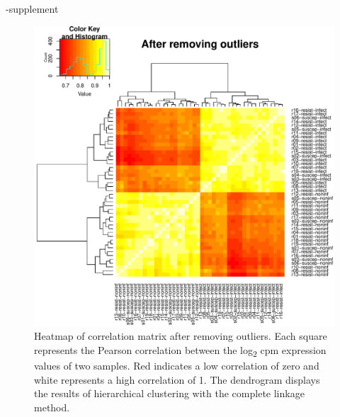 \documentclass[fleqn,10pt]{wlscirep}
\begin{document}
\begin{filecontents}{\jobname-supplement}
\begin{figure}[ht]
\centering
\includegraphics[width=\linewidth]{../figure/heatmap-no-outliers.pdf}
\caption{
Heatmap of correlation matrix after removing outliers. Each square
represents the Pearson correlation between the log\textsubscript{2}
cpm expression values of two samples. Red indicates a low correlation
of zero and white represents a high correlation of 1. The dendrogram
displays the results of hierarchical clustering with the complete
linkage method.
}
\label{fig:heat-filt}
\end{figure}



\end{filecontents}
\end{document}
